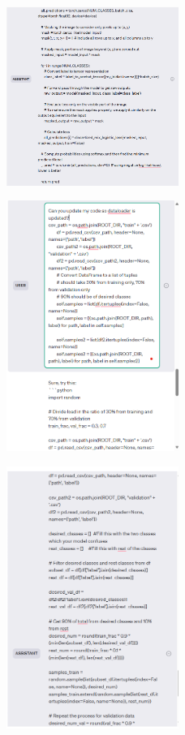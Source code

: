 \documentclass{article}
\begin{document}
\begin{figure}[H]
    \centering
    \includegraphics[width=0.5\textwidth]{report_data/g-16.png}
\end{figure}

\begin{figure}[H]
    \centering
    \includegraphics[width=0.5\textwidth]{report_data/g-17.png}
\end{figure}

\begin{figure}[H]
    \centering
    \includegraphics[width=0.5\textwidth]{report_data/g-18.png}
\end{figure}
\end{document}
